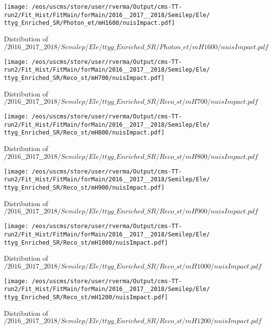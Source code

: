 \begin{figure}
\centering
\texttt{[image: /eos/uscms/store/user/rverma/Output/cms-TT-run2/Fit\_Hist/FitMain/forMain/2016\_\_2017\_\_2018/Semilep/Ele/ttyg\_Enriched\_SR/Photon\_et/mH1600/nuisImpact.pdf]}
\caption{Distribution of $/2016\_\_2017\_\_2018/Semilep/Ele/ttyg\_Enriched\_SR/Photon\_et/mH1600/nuisImpact.pdf$}
\end{figure}

\begin{figure}
\centering
\texttt{[image: /eos/uscms/store/user/rverma/Output/cms-TT-run2/Fit\_Hist/FitMain/forMain/2016\_\_2017\_\_2018/Semilep/Ele/ttyg\_Enriched\_SR/Reco\_st/mH700/nuisImpact.pdf]}
\caption{Distribution of $/2016\_\_2017\_\_2018/Semilep/Ele/ttyg\_Enriched\_SR/Reco\_st/mH700/nuisImpact.pdf$}
\end{figure}

\begin{figure}
\centering
\texttt{[image: /eos/uscms/store/user/rverma/Output/cms-TT-run2/Fit\_Hist/FitMain/forMain/2016\_\_2017\_\_2018/Semilep/Ele/ttyg\_Enriched\_SR/Reco\_st/mH800/nuisImpact.pdf]}
\caption{Distribution of $/2016\_\_2017\_\_2018/Semilep/Ele/ttyg\_Enriched\_SR/Reco\_st/mH800/nuisImpact.pdf$}
\end{figure}

\begin{figure}
\centering
\texttt{[image: /eos/uscms/store/user/rverma/Output/cms-TT-run2/Fit\_Hist/FitMain/forMain/2016\_\_2017\_\_2018/Semilep/Ele/ttyg\_Enriched\_SR/Reco\_st/mH900/nuisImpact.pdf]}
\caption{Distribution of $/2016\_\_2017\_\_2018/Semilep/Ele/ttyg\_Enriched\_SR/Reco\_st/mH900/nuisImpact.pdf$}
\end{figure}

\begin{figure}
\centering
\texttt{[image: /eos/uscms/store/user/rverma/Output/cms-TT-run2/Fit\_Hist/FitMain/forMain/2016\_\_2017\_\_2018/Semilep/Ele/ttyg\_Enriched\_SR/Reco\_st/mH1000/nuisImpact.pdf]}
\caption{Distribution of $/2016\_\_2017\_\_2018/Semilep/Ele/ttyg\_Enriched\_SR/Reco\_st/mH1000/nuisImpact.pdf$}
\end{figure}

\begin{figure}
\centering
\texttt{[image: /eos/uscms/store/user/rverma/Output/cms-TT-run2/Fit\_Hist/FitMain/forMain/2016\_\_2017\_\_2018/Semilep/Ele/ttyg\_Enriched\_SR/Reco\_st/mH1200/nuisImpact.pdf]}
\caption{Distribution of $/2016\_\_2017\_\_2018/Semilep/Ele/ttyg\_Enriched\_SR/Reco\_st/mH1200/nuisImpact.pdf$}
\end{figure}

